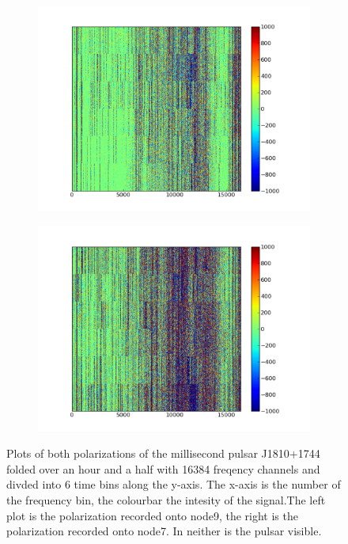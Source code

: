 \documentclass[a4paper,12pt]{article}
\begin{document}
\begin{figure}
\centering
\begin{subfigure}{0.5\textwidth}
  \centering
  \includegraphics[width=1.3\linewidth]{1810fig1node9.pdf}
  \label{fig:sub1810node9}
\end{subfigure}%
\begin{subfigure}{0.5\textwidth}
  \centering
  \includegraphics[width=1.3\linewidth]{1810fig2node7.pdf}
  \label{fig:sub1810node7}
\end{subfigure}
\caption{Plots of both polarizations of the millisecond pulsar J1810+1744 folded over an hour and a half with 16384 freqency channels and divded into 6 time bins along the y-axis. The x-axis is the number of the frequency bin, the colourbar the intesity of the signal.The left plot is the polarization recorded onto node9, the right is the polarization recorded onto node7. In neither is the pulsar visible.}
\label{fig:folding1810}
\end{figure}
\end{document}
